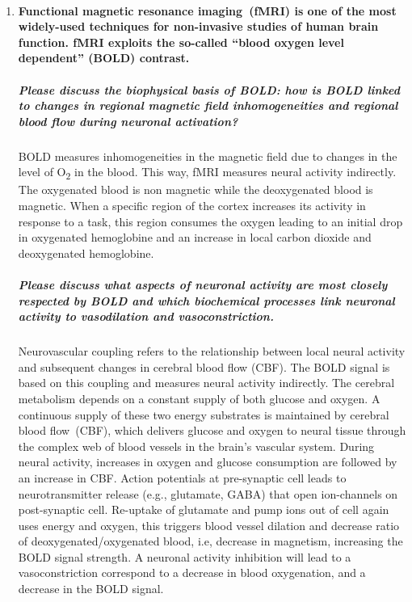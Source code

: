 \documentclass[12pt,article,oneside,a4paper]{memoir}
\begin{document}
\begin{enumerate}
\item \paragraph{Functional magnetic resonance imaging~(fMRI) is one of the
most widely-used techniques for non-invasive studies of human brain function.
fMRI exploits the so-called “blood oxygen level dependent” (BOLD) contrast.}

\subparagraph{Please discuss the biophysical basis of BOLD: how is BOLD linked
to changes in regional magnetic field inhomogeneities and regional blood flow
during neuronal activation?}

BOLD measures inhomogeneities in the magnetic field due to changes in the level
of O\textsubscript{2} in the blood. This way, fMRI measures neural activity
indirectly. The oxygenated blood is non magnetic while the deoxygenated blood
is magnetic. When a specific region of the cortex increases its activity in
response to a task, this region consumes the oxygen leading to an initial drop
in oxygenated hemoglobine and an increase in local carbon dioxide and
deoxygenated hemoglobine.

\subparagraph{Please discuss what aspects of neuronal activity are most closely
respected by BOLD and which biochemical processes link neuronal activity to 
vasodilation and vasoconstriction.}

Neurovascular coupling refers to the relationship between local neural activity
and subsequent changes in cerebral blood flow (CBF). The BOLD signal is based
on this coupling and measures neural activity indirectly.
The cerebral metabolism depends on a constant supply of both glucose and
oxygen. A continuous supply of these two energy substrates is maintained by
cerebral blood flow~(CBF), which delivers glucose and oxygen to neural tissue
through the complex web of blood vessels in the brain’s vascular system. During
neural activity, increases in oxygen and glucose consumption are followed by an
increase in CBF.
Action potentials at pre-synaptic cell leads to neurotransmitter release (e.g.,
glutamate, GABA) that open ion-channels on post-synaptic cell. Re-uptake of
glutamate and pump ions out of cell again uses energy and oxygen, this triggers
blood vessel dilation and decrease ratio of deoxygenated/oxygenated blood, i.e,
decrease in magnetism, increasing the BOLD signal strength. A neuronal activity
inhibition will lead to a vasoconstriction correspond to a decrease in blood
oxygenation, and a decrease in the BOLD signal.


\end{enumerate}
\end{document}
